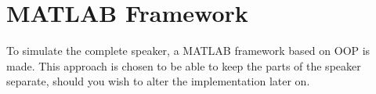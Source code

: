 
\chapter{MATLAB Framework}
To simulate the complete speaker, a MATLAB framework based on OOP is made. This approach is chosen to be able to keep the parts of the speaker separate, should you wish to alter the implementation later on.




%